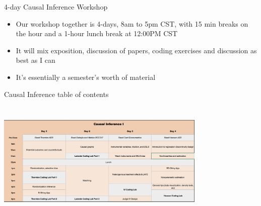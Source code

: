 \documentclass{beamer}
\begin{document}
\begin{frame}{4-day Causal Inference Workshop}

  \begin{itemize}
    \item Our workshop together is 4-days, 8am to 5pm CST, with 15 min breaks on the hour and a 1-hour lunch break at 12:00PM CST
    \item It will mix exposition, discussion of papers, coding exercises and discussion as best as I can
    \item It's essentially a semester's worth of material
  \end{itemize}

\end{frame}

\begin{frame}{Causal Inference table of contents}
  \centering
  \includegraphics[scale=0.5,height=6.5cm, width=10cm]{./lecture_includes/part1}
\end{frame}





%
\end{document}
